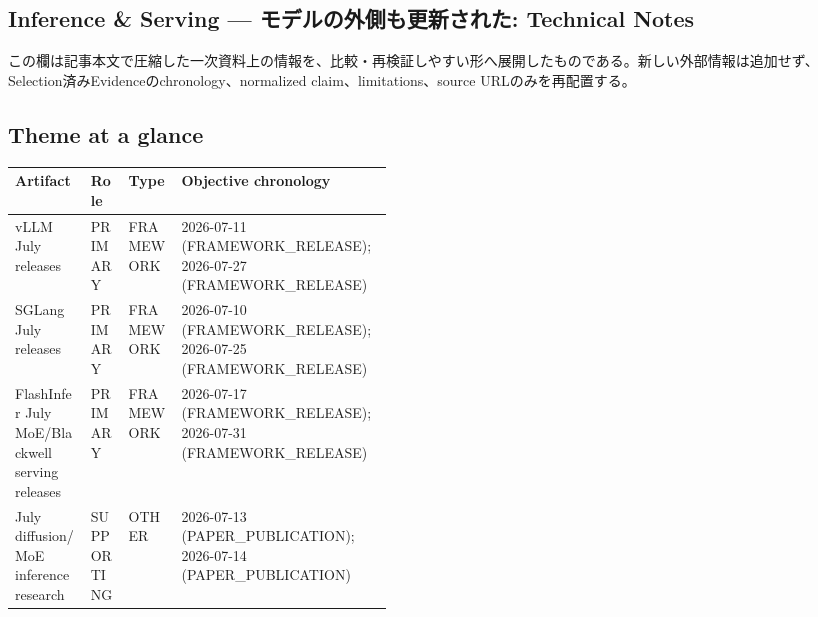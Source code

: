 \clearpage
{}
\subsection*{Inference \& Serving — モデルの外側も更新された: Technical Notes}
この欄は記事本文で圧縮した一次資料上の情報を、比較・再検証しやすい形へ展開したものである。新しい外部情報は追加せず、Selection済みEvidenceのchronology、normalized claim、limitations、source URLのみを再配置する。
\medskip
\subsection*{Theme at a glance}
\begin{center}
\footnotesize
\begin{tabularx}{\linewidth}{@{}p{0.20\linewidth}p{0.10\linewidth}p{0.14\linewidth}X@{}}
\toprule
Artifact & Role & Type & Objective chronology \\
\midrule
vLLM July releases & PRIMARY & FRAMEWORK & 2026-07-11 (FRAMEWORK\_RELEASE); 2026-07-27 (FRAMEWORK\_RELEASE) \\
SGLang July releases & PRIMARY & FRAMEWORK & 2026-07-10 (FRAMEWORK\_RELEASE); 2026-07-25 (FRAMEWORK\_RELEASE) \\
FlashInfer July MoE/Blackwell serving releases & PRIMARY & FRAMEWORK & 2026-07-17 (FRAMEWORK\_RELEASE); 2026-07-31 (FRAMEWORK\_RELEASE) \\
July diffusion/MoE inference research & SUPPORTING & OTHER & 2026-07-13 (PAPER\_PUBLICATION); 2026-07-14 (PAPER\_PUBLICATION) \\
\bottomrule
\end{tabularx}
\end{center}
\normalsize

